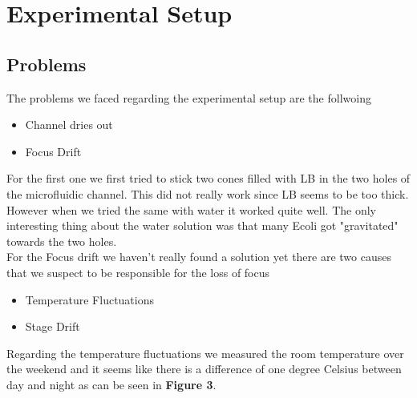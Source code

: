 \documentclass{article}
\begin{document}
\section{Experimental Setup}
\subsection{Problems}
The problems we faced regarding the experimental setup are the follwoing
\begin{itemize}
    \item Channel dries out
    \item Focus Drift
\end{itemize} 
For the first one we first tried to stick two cones filled with LB in the two holes of the microfluidic channel.
This did not really work since LB seems to be too thick. However when we tried the same with water it worked quite well.
The only interesting thing about the water solution was that many Ecoli got "gravitated" towards the two holes.
\medskip\\
For the Focus drift we haven't really found a solution yet there are two causes that we suspect to be responsible
for the loss of focus
\begin{itemize}
    \item Temperature Fluctuations
    \item Stage Drift 
\end{itemize}
Regarding the temperature fluctuations we measured the room temperature over the weekend and it seems like there is a
difference of one degree Celsius between day and night as can be seen in \textbf{Figure 3}.
\medskip\\
\end{document}
